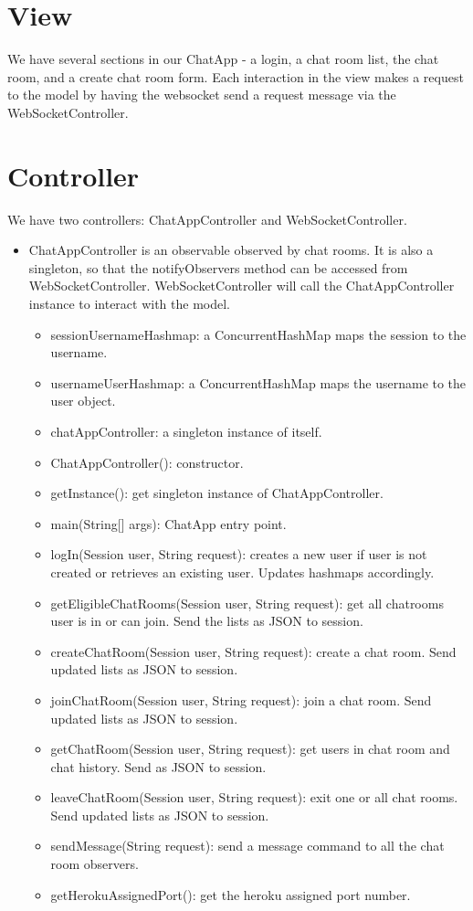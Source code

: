 \documentclass[letterpaper, 11pt]{article}
\begin{document}
\section{View}
We have several sections in our ChatApp - a login, a chat room list, the chat room, and a create chat room form. Each interaction in the view makes a request to the model by having the websocket send a request message via the WebSocketController.

\section{Controller}
We have two controllers: ChatAppController and WebSocketController. 
\begin{itemize}
\item ChatAppController is an observable observed by chat rooms. It is also a singleton, so that the notifyObservers method can be accessed from WebSocketController. WebSocketController will call the ChatAppController instance to interact with the model.
\begin{itemize}
  \item sessionUsernameHashmap: a ConcurrentHashMap maps the session to the username.
  \item usernameUserHashmap: a ConcurrentHashMap maps the username to the user object.
  \item chatAppController: a singleton instance of itself.
  \item ChatAppController(): constructor.
  \item getInstance(): get singleton instance of ChatAppController.
  \item main(String[] args): ChatApp entry point.
  \item logIn(Session user, String request): creates a new user if user is not created or retrieves an existing user. Updates hashmaps accordingly.
  \item getEligibleChatRooms(Session user, String request): get all chatrooms user is in or can join. Send the lists as JSON to session.
  \item createChatRoom(Session user, String request): create a chat room. Send updated lists as JSON to session.
  \item joinChatRoom(Session user, String request): join a chat room. Send updated lists as JSON to session.
  \item getChatRoom(Session user, String request): get users in chat room and chat history. Send as JSON to  session.
  \item leaveChatRoom(Session user, String request): exit one or all chat rooms. Send updated lists as JSON to session.
  \item sendMessage(String request): send a message command to all the chat room observers.
  \item getHerokuAssignedPort(): get the heroku assigned port number.
\end{itemize}


\end{itemize}
\end{document}
